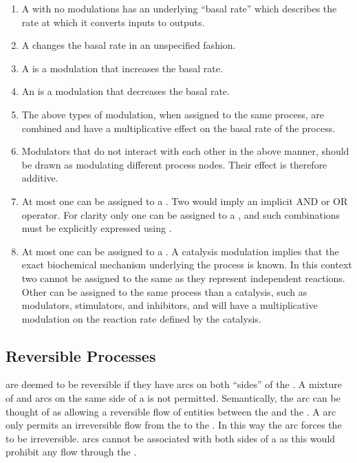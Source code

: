 \begin{enumerate}
\item A  with no modulations has an underlying ``basal rate''
  which describes the rate at which it converts inputs to outputs.
\item A  changes the basal rate in an unspecified fashion.
\item A  is a modulation that increases the basal rate.
\item An  is a modulation that decreases the basal rate.
\item The above types of modulation, when assigned to the same process, are combined and have a multiplicative effect on the basal rate of the process.
\item Modulators that do not interact with each other in the above manner, should be drawn as modulating different process nodes. Their effect is therefore additive.
\item At most one  can be assigned to a . Two 
  would imply an implicit AND or OR operator. For clarity only
  one  can be assigned to a , and such combinations must be
  explicitly expressed using .
\item At most one  can be assigned to a . A catalysis
  modulation implies that the exact biochemical mechanism underlying
  the process is known. In this context two  cannot
  be assigned to the same  as they represent
  independent reactions. Other  can be
  assigned to the same process than a catalysis, such as modulators, stimulators, and
  inhibitors, and will have a multiplicative modulation on the reaction
  rate defined by the catalysis.
\end{enumerate}

\subsection{Reversible Processes}
\label{sec: semantics reversible procs}

 are deemed to be reversible if they have  arcs on both ``sides'' of the . A mixture of  and  arcs on the same side of a  is not permitted. Semantically, the  arc can be thought of as allowing a reversible flow of entities between the  and the . A  arc only permits an irreversible flow from the  to the . In this way the  arc forces the  to be irreversible.  arcs cannot be associated with both sides of a  as this would prohibit any flow through the .


